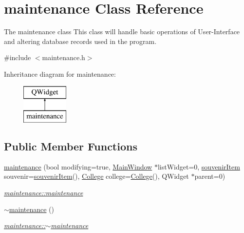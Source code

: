 \hypertarget{classmaintenance}{}\section{maintenance Class Reference}
\label{classmaintenance}


The maintenance class This class will handle basic operations of User-\/\+Interface and altering database records used in the program.  




{\ttfamily \#include $<$maintenance.\+h$>$}

Inheritance diagram for maintenance\+:\begin{figure}[H]
\begin{center}
\leavevmode
\includegraphics[height=2.000000cm]{classmaintenance}
\end{center}
\end{figure}
\subsection*{Public Member Functions}
\begin{DoxyCompactItemize}
\item 
\mbox{\hyperlink{classmaintenance_ae5cd12bbe9d483dd4d89123f52e31cf4}{maintenance}} (bool modifying=true, \mbox{\hyperlink{class_main_window}{Main\+Window}} $\ast$list\+Widget=0, \mbox{\hyperlink{structsouvenir_item}{souvenir\+Item}} souvenir=\mbox{\hyperlink{structsouvenir_item}{souvenir\+Item}}(), \mbox{\hyperlink{struct_college}{College}} college=\mbox{\hyperlink{struct_college}{College}}(), Q\+Widget $\ast$parent=0)
\begin{DoxyCompactList}\small\item\em \mbox{\hyperlink{classmaintenance_ae5cd12bbe9d483dd4d89123f52e31cf4}{maintenance\+::maintenance}} \end{DoxyCompactList}\item 
\mbox{\hyperlink{classmaintenance_a7d52b97e64d46d02e3365014d93e3148}{$\sim$maintenance}} ()
\begin{DoxyCompactList}\small\item\em \mbox{\hyperlink{classmaintenance_a7d52b97e64d46d02e3365014d93e3148}{maintenance\+::$\sim$maintenance}} \end{DoxyCompactList}\end{DoxyCompactItemize}


